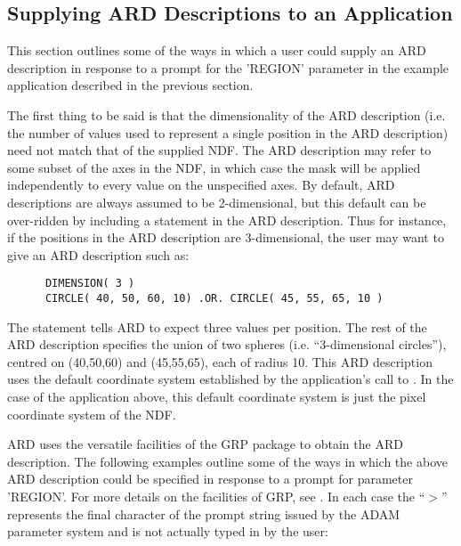 \subsection{Supplying ARD Descriptions to an Application}
This section outlines some of the ways in which a user could supply an ARD
description in response to a prompt for the 'REGION' parameter in the example
application described in the previous section. 

The first thing to be said is that the dimensionality of the ARD
description (i.e. the number of values used to represent a single
position in the ARD description) need not match that of the supplied NDF.
The ARD description may refer to some subset of the axes in the NDF, in
which case the mask will be applied independently to every value on the
unspecified axes. By default, ARD descriptions are always assumed to be
2-dimensional, but this default can be over-ridden by including a
 statement in the ARD description. Thus for
instance, if the positions in the ARD description are 3-dimensional, the user 
may want to give an ARD description such as:

\small
\begin{verbatim}
      DIMENSION( 3 )
      CIRCLE( 40, 50, 60, 10) .OR. CIRCLE( 45, 55, 65, 10 ) 
\end{verbatim}
\normalsize

The  statement tells ARD to expect three values per position. The rest
of the ARD description specifies the union of two spheres (i.e. ``3-dimensional
circles''), centred on (40,50,60) and (45,55,65), each of radius 10. This ARD
description uses the default coordinate system established by the application's
call to . In the case of the application above, this default
coordinate system is just the pixel coordinate system of the NDF. 

ARD uses the versatile facilities of the GRP package to obtain the ARD
description. The following examples outline some of the ways in which the above
ARD description could be specified in response to a prompt for parameter
'REGION'. For more details on the facilities of GRP, see . In each case
the ``$>$'' represents the final character of the prompt string issued by the
ADAM parameter system and is not actually typed in by the user: 


